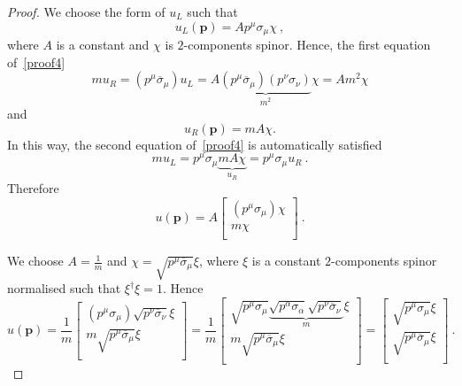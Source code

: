 \begin{proof}
        We choose the form of $u_L$ such that 
        \begin{equation*}
            u_L (\mathbf p) = A p^\mu \sigma_\mu \chi ~,
        \end{equation*}
        where $A$ is a constant and $\chi$ is $2$-components spinor. 
        Hence, the first equation of~\eqref{proof4}
        \begin{equation*}
            m u_R = (p^\mu \overline \sigma_\mu) u_L = A \underbrace{(p^\mu \overline \sigma_\mu) (p^\nu \sigma_\nu)}_{m^2} \chi = A m^2 \chi
        \end{equation*}
        and 
        \begin{equation*}
            u_R (\mathbf p) = m A \chi.
        \end{equation*}
        In this way, the second equation of~\eqref{proof4} is automatically satisfied
        \begin{equation*}
            m u_L = p^\mu \sigma_\mu \underbrace{m A \chi }_{u_R} = p^\mu \sigma_\mu u_R ~.
        \end{equation*}
        Therefore 
        \begin{equation*}
            u (\mathbf p) = A \begin{bmatrix}
                (p^\mu \sigma_\mu) \chi \\ m \chi \\
            \end{bmatrix} ~.
        \end{equation*} 

        We choose $A = \frac{1}{m}$ and $\chi = \sqrt{p^\mu \overline \sigma_\mu} \xi$, where $\xi$ is a constant $2$-components spinor normalised such that $\xi^\dagger \xi = 1$. Hence 
        \begin{equation*}
            u (\mathbf p) = \frac{1}{m} \begin{bmatrix}
                (p^\mu \sigma_\mu) \sqrt{p^\nu \overline \sigma_\nu} \xi \\ m \sqrt{p^\mu \overline \sigma_\mu} \xi \\
            \end{bmatrix} = \frac{1}{m} \begin{bmatrix}
                \sqrt{p^\mu \sigma_\mu} \underbrace{\sqrt{p^\alpha \sigma_\alpha} \sqrt{p^\nu \overline \sigma_\nu}}_m \xi \\ m \sqrt{p^\mu \overline \sigma_\mu} \xi \\
            \end{bmatrix} = \begin{bmatrix}
                \sqrt{p^\mu \sigma_\mu} \xi \\ \sqrt{p^\mu \overline \sigma_\mu} \xi \\
            \end{bmatrix} ~.
            \end{equation*}
    \end{proof}

